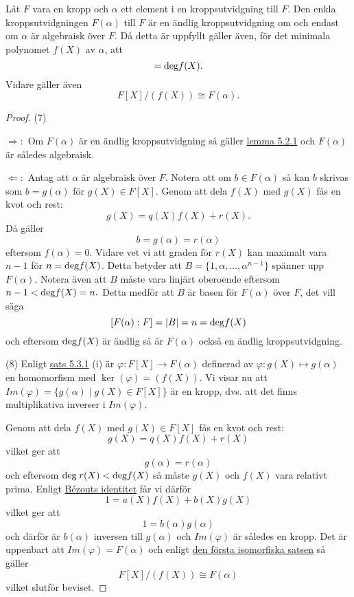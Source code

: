 \documentclass{article}
\newcommand{\grad}[0]{\textnormal{deg}}
\theoremstyle{definition}
\begin{document}
\hypertarget{5.3.2}{}
\begin{mytheo}{}{}
  Låt $F$ vara en kropp och $\alpha$ ett element i en kroppsutvidgning till $F$. Den enkla kroppsutvidgningen $F(\alpha)$ till $F$ är en 
  ändlig kroppsutvidgning om och endast om $\alpha$ är algebraisk över $F$. Då detta är uppfyllt gäller även, för det minimala polynomet $f(X)$ av $\alpha$, att
  \begin{equation}
    [F(\alpha) : F] = \grad f(X).
  \end{equation}
  Vidare gäller även 
  \begin{equation}
    F[X]/(f(X)) \cong F(\alpha).
  \end{equation}
\end{mytheo}
\begin{proof}
  (7) 
  
  $\Rightarrow:$ Om $F(\alpha)$ är en ändlig kroppsutvidgning så gäller \hyperlink{algebraiskkropp}{lemma 5.2.1} och $F(\alpha)$ är således algebraisk. 
  
  $\Leftarrow:$ Antag att $\alpha$ är algebraisk över $F$. Notera att om $b \in F(\alpha)$ så kan $b$ skrivas som $b = g(\alpha)$ för $g(X) \in F[X].$
  Genom att dela $f(X)$ med $g(X)$ fås en kvot och rest: 
  \[g(X) = q(X)f(X) + r(X).\]
  Då gäller 
  \[b = g(\alpha) = r(\alpha)\]
  eftersom $f(\alpha) = 0$. Vidare vet vi att graden för $r(X)$ kan maximalt vara $n-1$ för $n = \grad f(X)$. Detta betyder att $B = \{1, \alpha, \ldots, \alpha^{n-1}\}$
  spänner upp $F(\alpha)$. Notera även att $B$ måste vara linjärt oberoende eftersom $n-1 < \grad f(X) = n.$ Detta medför att $B$ är basen för $F(\alpha)$ över $F$, 
  det vill säga 
  \[ [F(\alpha): F] = |B| = n = \grad f(X) \]
  och eftersom $\grad f(X)$ är ändlig så är $F(\alpha)$ också en ändlig kroppsutvidgning. 

  (8) Enligt \hyperlink{minpol}{sats 5.3.1} (i) är $\varphi: F[X] \rightarrow F(\alpha)$ definerad av $\varphi: g(X) \mapsto g(\alpha)$ 
  en homomorfism med $\ker(\varphi) = (f(X)).$ Vi visar nu att $Im(\varphi) = \{g(\alpha) \; | \; g(X) \in F[X]\}$ är en kropp, 
  dvs. att det finns multiplikativa inverser i $Im(\varphi)$. 

  Genom att dela $f(X)$ med $g(X) \in F[X]$ fås en kvot och rest: 
  \[g(X) = q(X)f(X) + r(X)\]
  vilket ger att 
  \[g(\alpha) = r(\alpha)\]
  och eftersom $\grad \; r(X) < \grad f(X)$ så måste $g(X)$ och $f(X)$ vara relativt prima. Enligt \hyperlink{Bézouts identitet}{Bézouts identitet}
  får vi därför 
  \[1 = a(X)f(X) + b(X)g(X)\]
  vilket ger att 
  \[1 = b(\alpha)g(\alpha)\]
  och därför är $b(\alpha)$ inversen till $g(\alpha)$ och $Im(\varphi)$ är således en kropp. Det är uppenbart att $Im(\varphi) = F(\alpha)$
  och enligt \hyperlink{isomorfiska}{den första isomorfiska satsen} så gäller 
  \[F[X]/(f(X)) \cong F(\alpha)\]
  vilket slutför beviset.
\end{proof}
\end{document}
